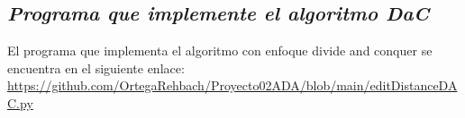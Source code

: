 \subsection{\textit{\textbf{Programa que implemente el algoritmo DaC}}}

El programa que implementa el algoritmo con enfoque divide and conquer se encuentra en el siguiente enlace: \url{https://github.com/OrtegaRehbach/Proyecto02ADA/blob/main/editDistanceDAC.py}